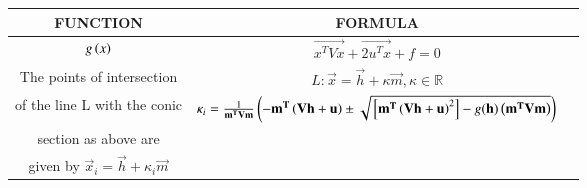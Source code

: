 \begin{tabular}{|c|c|c|}
	\hline
            \textbf{FUNCTION} & \textbf{FORMULA} \\
        \hline
            $g\left(x\right)$ & $\vec{x^TVx}+\vec{2u^Tx}+f=0$ \\
        \hline
	    The points of intersection & $ L: \vec{x} = \vec{h} + \kappa\vec{m}, \kappa \in \mathbb{R} $ \\ of the line L with the conic & $\kappa_i = \frac{1}{\mathbf{m^TVm}}\left(\mathbf{-m^T\left(Vh+u\right)} \pm \sqrt{{}\left[\mathbf{m^T\left(Vh+u\right)}^2\right] - g(\mathbf{h})\left(\mathbf{m^TVm}\right)}\right) $ \\ section as above are \\ given by $ \vec{x}_i = \vec{h} + \kappa_i\vec{m} $ \\
        \hline
\end{tabular}
